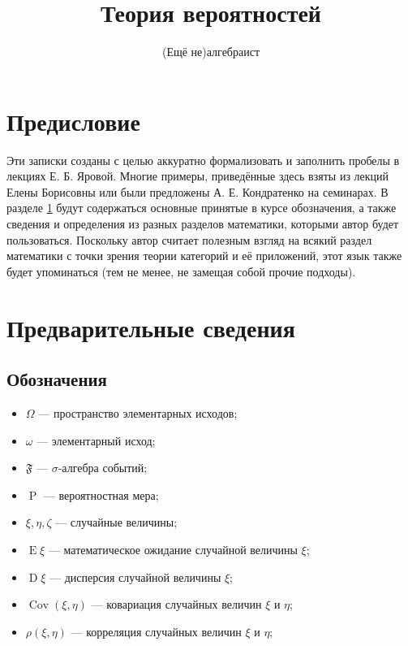 \documentclass[12pt]{article}
\title{Теория вероятностей}
\author{(Ещё не)алгебраист}
\numberwithin{theorem}{section}
\theoremstyle{definition}
\newcommand{\prob}{\operatorname{P}}
\newcommand{\events}{\mathfrak{F}}
\newcommand{\expect}{\operatorname{E}}
\newcommand{\disp}{\operatorname{D}}
\newcommand{\cov}{\operatorname{Cov}}
\begin{document}
	\maketitle
	
	\section*{Предисловие}
	
	Эти записки созданы с целью аккуратно формализовать и заполнить пробелы в лекциях Е. Б. Яровой.
	Многие примеры, приведённые здесь взяты из лекций Елены Борисовны или были предложены А. Е. Кондратенко на семинарах.
	В разделе \ref{preparing} будут содержаться основные принятые в курсе обозначения, 
	а также сведения и определения из разных разделов математики, которыми автор будет пользоваться.
	Поскольку автор считает полезным взгляд на всякий раздел математики с точки зрения теории категорий и её приложений, 
	этот язык также будет упоминаться (тем не менее, не замещая собой прочие подходы).
	
	\tableofcontents
	
	
	\section{Предварительные сведения} \label{preparing}
	
	\subsection{Обозначения}
	
	
	\begin{itemize}
		\item $ \Omega $ --- пространство элементарных исходов;
		\item $ \omega $ --- элементарный исход;
		\item $ \events $ --- $ \sigma $-алгебра событий;
		\item $ \prob $ --- вероятностная мера;
		\item $ \xi, \eta, \zeta $ --- случайные величины;
		\item $ \expect \xi $ --- математическое ожидание случайной величины $ \xi $;
		\item $ \disp \xi $ --- дисперсия случайной величины $ \xi $;
		\item $ \cov(\xi, \eta) $ --- ковариация случайных величин $ \xi $ и $ \eta $;
		\item $ \rho(\xi, \eta) $ --- корреляция случайных величин $ \xi $ и $ \eta $;
	\end{itemize}
	
\end{document}
